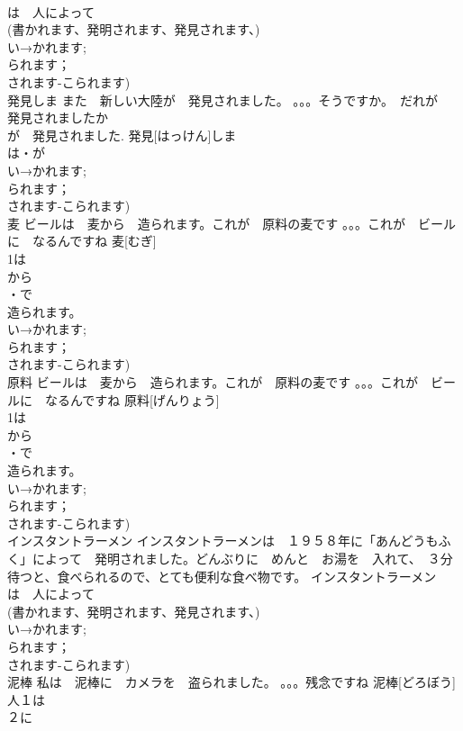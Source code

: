 \documentclass[8pt]{extreport}
\begin{document}
\begin{CJK}{UTF8}{min}
\\	は　人によって　
\\	(書かれます、発明されます、発見されます、)	
\\	い→かれます;
\\	られます；
\\	されます-こられます)
\\	発見しま	また　新しい大陸が　発見されました。 。。。そうですか。　だれが　発見されましたか 
\\	が　発見されました.	発見[はっけん]しま			
\\	は・が
\\	い→かれます;
\\	られます；
\\	されます-こられます)
\\	麦	ビールは　麦から　造られます。これが　原料の麦です 。。。これが　ビールに　なるんですね	麦[むぎ]				
\\	1は　
\\	から
\\	・で
\\	造られます。
\\	い→かれます;
\\	られます；
\\	されます-こられます)
\\	原料	ビールは　麦から　造られます。これが　原料の麦です 。。。これが　ビールに　なるんですね	原料[げんりょう]			
\\	1は　
\\	から
\\	・で
\\	造られます。
\\	い→かれます;
\\	られます；
\\	されます-こられます)
\\	インスタントラーメン	インスタントラーメンは　１９５８年に「あんどうもふく」によって　発明されました。どんぶりに　めんと　お湯を　入れて、　３分待つと、食べられるので、とても便利な食べ物です。	インスタントラーメン				
\\	は　人によって　
\\	(書かれます、発明されます、発見されます、)		
\\	い→かれます;
\\	られます；
\\	されます-こられます)
\\	泥棒	私は　泥棒に　カメラを　盗られました。 。。。残念ですね	泥棒[どろぼう]			
\\	人１は　
\\	２に　

\end{CJK}
\end{document}
